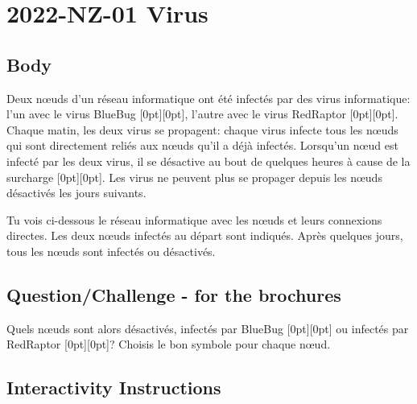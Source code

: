 \documentclass[a4paper,11pt]{report}
\newcommand{\taskGraphicsFolder}{..}
\begin{document}
\section*{\centering{} 2022-NZ-01 Virus}


\subsection*{Body}

Deux nœuds d’un réseau informatique ont été infectés par des virus informatique: l’un avec le virus BlueBug \raisebox{-0.5ex}[0pt][0pt]{}, l’autre avec le virus RedRaptor \raisebox{-0.5ex}[0pt][0pt]{}. Chaque matin, les deux virus se propagent: chaque virus infecte tous les nœuds qui sont directement reliés aux nœuds qu’il a déjà infectés. Lorsqu’un nœud est infecté par les deux virus, il se désactive au bout de quelques heures à cause de la surcharge \raisebox{-0.5ex}[0pt][0pt]{}. Les virus ne peuvent plus se propager depuis les nœuds désactivés les jours suivants.

Tu vois ci-dessous le réseau informatique avec les nœuds et leurs connexions directes. Les deux nœuds infectés au départ sont indiqués. Après quelques jours, tous les nœuds sont infectés ou désactivés.

{\em


\subsection*{Question/Challenge - for the brochures}

Quels nœuds sont alors désactivés, infectés par BlueBug \raisebox{-0.5ex}[0pt][0pt]{} ou infectés par RedRaptor \raisebox{-0.5ex}[0pt][0pt]{}?
Choisis le bon symbole pour chaque nœud.

{\centering%
\par}

}


\subsection*{Interactivity Instructions}
\end{document}
